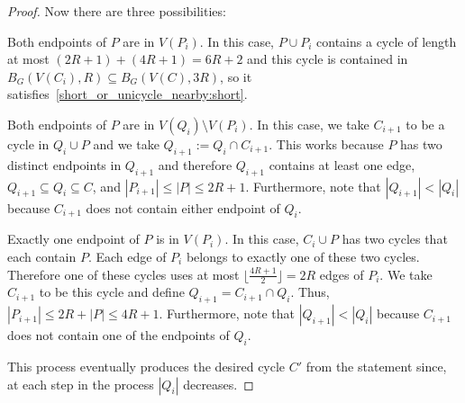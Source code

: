 \documentclass{patmorin}
\newcommand{\pat}[1]{\textcolor{Blue}{Pat: #1}}
\begin{document}
\begin{proof}
  Now there are three possibilities:
  \begin{compactenum}
    \item Both endpoints of $P$ are in $V(P_{i})$.
    In this case, $P\cup P_{i}$ contains a cycle of length at most
    $(2R+1)+(4R+1)=6R+2$ and this cycle is contained in $B_G(V(C_i),R)\subseteq B_G(V(C),3R)$, so it satisfies~\eqref{short_or_unicycle_nearby:short}.
    \item Both endpoints of $P$ are in $V(Q_{i})\setminus V(P_{i})$.
    In this case, we take $C_{i+1}$ to be a cycle in $Q_{i}\cup P$ and
    we take $Q_{i+1}:= Q_i\cap C_{i+1}$. %
    This works because $P$ has two distinct endpoints in $Q_{i+1}$
    and therefore $Q_{i+1}$ contains at least one edge,
    $Q_{i+1}\subseteq Q_i\subseteq C$, and
    $|P_{i+1}|\leq|P|\leq 2R+1$.
    Furthermore, note that $|Q_{i+1}| < |Q_{i}|$ because $C_{i+1}$ does not contain either endpoint of $Q_{i}$.
    \item Exactly one endpoint of $P$ is in $V(P_{i})$.
    In this case, $C_{i}\cup P$ has two cycles that each contain $P$.
    Each edge of $P_{i}$ belongs to exactly one of these two cycles.
    Therefore one of these cycles uses at most $\lfloor\frac{4R+1}{2}\rfloor=2R$ edges of $P_{i}$.
    We take $C_{i+1}$ to be this cycle and define
    $Q_{i+1}=C_{i+1}\cap Q_i$. %
    Thus, $|P_{i+1}| \leq 2R+|P|\leq 4R+1$.
    Furthermore, note that $|Q_{i+1}| < |Q_{i}|$ because $C_{i+1}$ does not contain one of the endpoints of $Q_{i}$.
  \end{compactenum}
  This process eventually produces the desired cycle $C'$ from the statement since, at each step in the process $|Q_i|$ decreases.
\end{proof}


\end{document}
